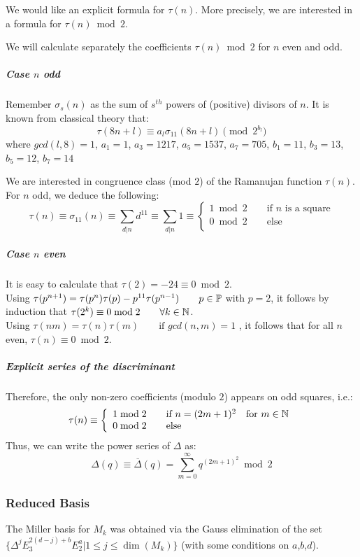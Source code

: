 We would like an explicit formula for $\tau(n)$. More precisely, we are interested in a formula for $\tau(n) \bmod 2$.

We will calculate separately the coefficients $\tau(n) \bmod 2$ for $n$ even and odd.

\subparagraph{Case $n$ odd}
Remember $\sigma_s(n)$ as the sum of $s^{th}$ powers of (positive) divisors of $n$.
It is known from classical theory \cite[p.8]{kolberg} that:
$$\tau(8n+l) \equiv a_l \sigma_{11}(8n+l) \pmod {2^{b_l}} $$
where $gcd(l,8)=1$, $a_1 = 1$, $a_3 = 1217$, $a_5 = 1537$, $a_7 = 705$, 
$b_1 = 11$, $b_3 = 13$, $b_5 = 12$, $b_7 = 14$

We are interested in congruence class (mod $2$) of the Ramanujan function $\tau(n)$.
For $n$ odd, we deduce the following:
$$\tau(n) \equiv \sigma_{11}(n) \equiv \sum_{d | n} d^{11}
\equiv \sum_{d | n} 1 \equiv \left\lbrace
\begin{array}{ll}
1 \bmod 2 \qquad \text{if } n \text{ is a square}\\
0 \bmod 2 \qquad \text{else}\\
\end{array} \right.
$$
\subparagraph{Case $n$ even}
It is easy to calculate that $\tau(2) = -24 \equiv 0 \bmod 2$.\\
Using $\tau(p^{n+1}) = \tau(p^n)\tau(p) - p^{11}\tau(p^{n-1}) \qquad p \in \mathbb{P}$ \cite[p.97]{CourseInArithmetic} with $p=2$,
it follows by induction that $\tau(2^k) \equiv 0 \bmod 2 \qquad \forall k \in \mathbb{N}$.\\
Using $\tau(nm) = \tau(n)\tau(m) \qquad \text{if } gcd(n,m)=1$ \cite[p.97]{CourseInArithmetic},
it follows that for all $n$ even, $\tau(n) \equiv 0 \bmod 2$.
\subparagraph[Summary]{Explicit series of the discriminant}
\label{DeltaSeries}
Therefore, the only non-zero coefficients (modulo $2$) appears on odd squares, i.e.:
$$\tau(n) \equiv \left\lbrace \begin{array}{ll}
1 \bmod 2 \qquad \text{if } n=(2m+1)^2 \quad \text{for } m \in \mathbb{N}\\
0 \bmod 2 \qquad \text{else} 
\end{array}\right.$$
Thus, we can write the power series of $\Delta$ as:
\[
\Delta(q) \equiv \overline{\Delta}(q) = \sum_{m=0}^{\infty} q^{(2m+1)^2} \bmod 2
\label{eq:Delta}
\]

\subsubsection{Reduced Basis}
The Miller basis for $M_k$ was obtained via the Gauss elimination of the set $\{ \Delta^jE_3^{2(d-j)+b}E_2^a | 1 \leq j \leq \dim(M_k) \}$ (with some conditions on $a$,$b$,$d$).

